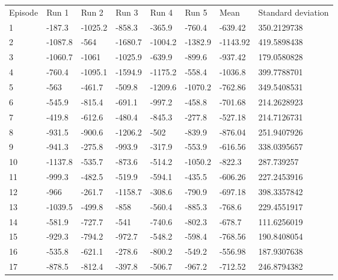 



\begin{table}[h]
\begin{tabular}{llllllll}
Episode & Run 1   & Run 2   & Run 3   & Run 4   & Run 5   & Mean     & Standard deviation \\
1       & -187.3  & -1025.2 & -858.3  & -365.9  & -760.4  & -639.42  & 350.2129738        \\
2       & -1087.8 & -564    & -1680.7 & -1004.2 & -1382.9 & -1143.92 & 419.5898438        \\
3       & -1060.7 & -1061   & -1025.9 & -639.9  & -899.6  & -937.42  & 179.0580828        \\
4       & -760.4  & -1095.1 & -1594.9 & -1175.2 & -558.4  & -1036.8  & 399.7788701        \\
5       & -563    & -461.7  & -509.8  & -1209.6 & -1070.2 & -762.86  & 349.5408531        \\
6       & -545.9  & -815.4  & -691.1  & -997.2  & -458.8  & -701.68  & 214.2628923        \\
7       & -419.8  & -612.6  & -480.4  & -845.3  & -277.8  & -527.18  & 214.7126731        \\
8       & -931.5  & -900.6  & -1206.2 & -502    & -839.9  & -876.04  & 251.9407926        \\
9       & -941.3  & -275.8  & -993.9  & -317.9  & -553.9  & -616.56  & 338.0395657        \\
10      & -1137.8 & -535.7  & -873.6  & -514.2  & -1050.2 & -822.3   & 287.739257         \\
11      & -999.3  & -482.5  & -519.9  & -594.1  & -435.5  & -606.26  & 227.2453916        \\
12      & -966    & -261.7  & -1158.7 & -308.6  & -790.9  & -697.18  & 398.3357842        \\
13      & -1039.5 & -499.8  & -858    & -560.4  & -885.3  & -768.6   & 229.4551917        \\
14      & -581.9  & -727.7  & -541    & -740.6  & -802.3  & -678.7   & 111.6256019        \\
15      & -929.3  & -794.2  & -972.7  & -548.2  & -598.4  & -768.56  & 190.8408054        \\
16      & -535.8  & -621.1  & -278.6  & -800.2  & -549.2  & -556.98  & 187.9307638        \\
17      & -878.5  & -812.4  & -397.8  & -506.7  & -967.2  & -712.52  & 246.8794382        \\

\end{tabular}
\end{table}
